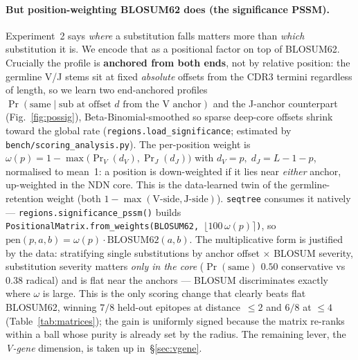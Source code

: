 \documentclass[11pt]{article}
\theoremstyle{oldplain}
\theoremstyle{oldrem}
\begin{document}
\paragraph{But position-weighting BLOSUM62 does (the significance PSSM).}\label{sec:possig}
Experiment~2 says \emph{where} a substitution falls matters more than \emph{which} substitution it is.
We encode that as a positional factor on top of BLOSUM62. Crucially the profile is \textbf{anchored from
both ends}, not by relative position: the germline V/J stems sit at fixed \emph{absolute} offsets from
the CDR3 termini regardless of length, so we learn two end-anchored profiles
$\Pr(\text{same}\mid\text{sub at offset }d\text{ from the V anchor})$ and the J-anchor counterpart
(Fig.~\ref{fig:possig}), Beta-Binomial-smoothed so sparse deep-core offsets shrink toward the global
rate (\texttt{regions.load\_significance}; estimated by \texttt{bench/scoring\_analysis.py}). The
per-position weight is $\omega(p)=1-\max\!\bigl(\Pr_V(d_V),\Pr_J(d_J)\bigr)$ with $d_V=p,\;d_J=L-1-p$,
normalised to mean~1: a position is down-weighted if it lies near \emph{either} anchor, up-weighted in
the NDN core. This is the data-learned twin of the germline-retention weight (both
$1-\max(\text{V-side},\text{J-side})$). \texttt{seqtree} consumes it natively ---
\texttt{regions.significance\_pssm()} builds \texttt{PositionalMatrix.from\_weights(BLOSUM62,
$\lfloor100\,\omega(p)\rceil$)}, so $\mathrm{pen}(p,a,b)=\omega(p)\cdot\mathrm{BLOSUM62}(a,b)$. The
multiplicative form is justified by the data: stratifying single substitutions by anchor offset
$\times$ BLOSUM severity, substitution severity matters \emph{only in the core} ($\Pr(\text{same})$
$0.50$ conservative vs $0.38$ radical) and is flat near the anchors --- BLOSUM discriminates exactly
where $\omega$ is large. This is the only scoring change that clearly beats flat BLOSUM62, winning
$7/8$ held-out epitopes at distance~$\le2$ and $6/8$ at $\le4$ (Table~\ref{tab:matrices}); the gain is
uniformly signed because
the matrix re-ranks within a ball whose purity is already set by the radius. The remaining lever, the
\emph{V-gene} dimension, is taken up in~\S\ref{sec:vgene}.
\end{document}
